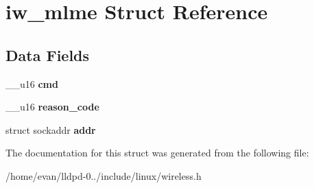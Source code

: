 \section{iw\-\_\-mlme \-Struct \-Reference}
\label{structiw__mlme}
\subsection*{\-Data \-Fields}
\begin{DoxyCompactItemize}
\item 
\-\_\-\-\_\-u16 {\bfseries cmd}\label{structiw__mlme_af70e433620500cd406e2207da6fdf275}

\item 
\-\_\-\-\_\-u16 {\bfseries reason\-\_\-code}\label{structiw__mlme_afafd8e18d4303835285bd2a8bd98c9a7}

\item 
struct sockaddr {\bfseries addr}\label{structiw__mlme_a979fbf6cbda14801a80be566a480f4ad}

\end{DoxyCompactItemize}


\-The documentation for this struct was generated from the following file\-:\begin{DoxyCompactItemize}
\item 
/home/evan/lldpd-\/0../include/linux/wireless.\-h\end{DoxyCompactItemize}
